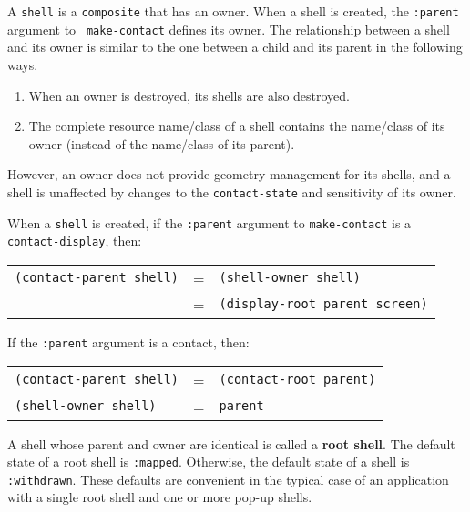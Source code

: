 
A {\tt shell} is a {\tt composite} that has an owner.
When a shell is created, the {\tt :parent} argument to {\tt
make-contact} defines its owner.  The relationship
between a shell and its
owner is similar to the one between a child and its parent in the
following ways.

\begin{enumerate}
\item When an owner is destroyed, its shells are also destroyed.
\item The complete resource name/class of a shell contains the name/class
	   of its owner (instead of the name/class of its parent).
\end{enumerate}

However, an owner does not provide geometry management for its shells, and a
shell is unaffected by changes to the {\tt contact-state} and sensitivity
of its owner.

When a {\tt shell} is created, if the {\tt :parent} argument to
{\tt make-contact} is a {\tt contact-display}, then:

\begin{center}
\begin{tabular}{lll}
{\tt (contact-parent shell)} & =  & {\tt (shell-owner shell)}\\
                             & =  &{\tt (display-root parent screen)}\\
\end{tabular} \end{center}

If the {\tt :parent} argument is a contact, then:

\begin{center}
\begin{tabular}{lll}
{\tt (contact-parent shell)} & =  & {\tt (contact-root parent)}\\
{\tt (shell-owner shell)}    & =  & {\tt parent}\\ 
\end{tabular} \end{center}

A shell whose parent and owner are identical is called a {\bf root
shell}. The default state of a root
shell is {\tt :mapped}.  Otherwise, the default state of a shell is {\tt
:withdrawn}.  These defaults are convenient in the typical case of an
application with a single root shell and one or more pop-up
shells.


